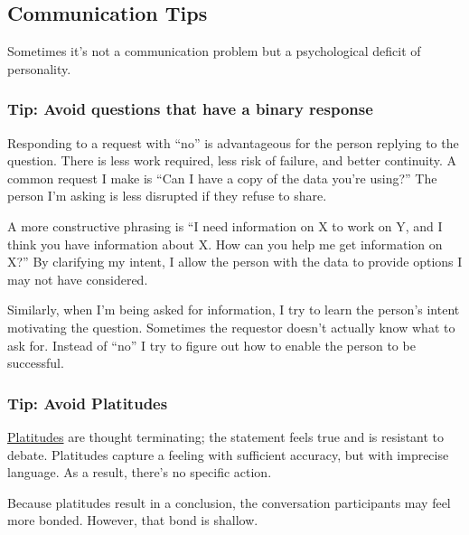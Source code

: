 \subsection{Communication Tips}

Sometimes it's not a communication problem but a psychological deficit of personality.


\subsubsection{Tip: Avoid questions that have a binary response\label{sec:yes_no_questions}}

Responding to a request with ``no'' is advantageous for the person replying to the question. There is less work required, less risk of failure, and better continuity. A common request I make is ``Can I have a copy of the data you're using?'' The person I'm asking is less disrupted if they refuse to share. 

A more constructive phrasing is ``I need information on X to work on Y, and I think you have information about X. How can you help me get information on X?'' By clarifying my intent, I allow the person with the data to provide options I may not have considered.

Similarly, when I'm being asked for information, I try to learn the person's intent motivating the question. Sometimes the requestor doesn't actually know what to ask for. Instead of ``no'' I try to figure out how to enable the person to be successful. 

\subsubsection{Tip: Avoid Platitudes\label{sec:platitudes}}
\href{https://en.wikipedia.org/wiki/Platitude}{Platitudes} are \gls{thought terminating}; the statement feels true and is resistant to debate. Platitudes capture a feeling with sufficient accuracy, but with imprecise language. As a result, there's no specific action.

Because platitudes result in a conclusion, the conversation participants may feel more bonded. However, that bond is shallow.

